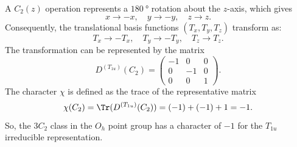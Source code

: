 \begin{solution}
  A $C_2(z)$ operation represents a $\qty{180}\degree$ rotation about
  the $z$-axis, which gives
  \[
    x \to -x, \quad y \to -y, \quad z \to z.
  \]
  Consequently, the translational basis functions $(T_x, T_y, T_z)$
  transform as:
  \[
    T_x \to -T_x, \quad T_y \to -T_y, \quad T_z \to T_z.
  \]
  The transformation can be represented by the matrix
  \[
    D^{(T_{1u})}(C_2) =
    \begin{pmatrix}
    -1 & 0  & 0\\
    0  & -1 & 0\\
    0  & 0  & 1
    \end{pmatrix}.
  \]
  The character $\chi$ is defined as the trace of the
  representative matrix
  \[
    \chi(C_2) = \Tr(D^{(T_{1u})}(C_2)) =  (-1) + (-1) + 1 = -1.
  \]
  So, the $3C_2$ class in the $O_h$ point group has a character of $-1$ for
  the $T_{1u}$ irreducible representation.
\end{solution}
